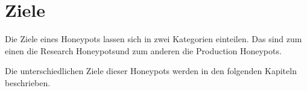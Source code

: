 \section{Ziele}

Die Ziele eines Honeypots lassen sich in zwei Kategorien einteilen. Das sind zum einen die \glqq Research Honeypots\grqq und zum anderen die \glqq Production Honeypots\grqq. 

Die unterschiedlichen Ziele dieser Honeypots werden in den folgenden Kapiteln beschrieben.

